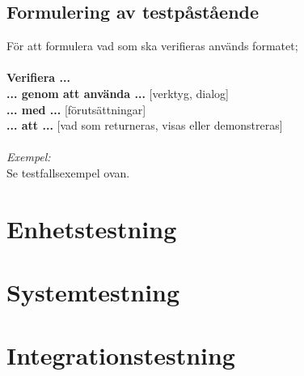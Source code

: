 \subsection{Formulering av testpåstående}
För att formulera vad som ska verifieras används formatet; \\
\\
\textbf{Verifiera ...} \\
\textbf{... genom att använda ...} [verktyg, dialog] \\
\textbf{... med ...} [förutsättningar] \\
\textbf{... att ...} [vad som returneras, visas eller demonstreras]\\
\\
\textit{Exempel:}\\
Se testfallsexempel ovan.

\section{Enhetstestning}
\section{Systemtestning}
\section{Integrationstestning}